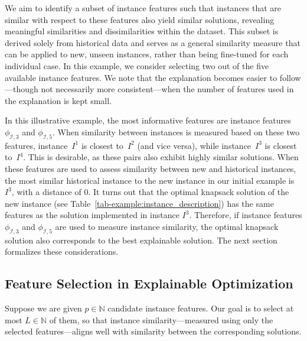 \documentclass[11pt, a4paper]{article}
\begin{document}
We aim to identify a subset of instance features such that instances that are similar with respect to these features also yield similar solutions, revealing meaningful similarities and dissimilarities within the dataset.
This subset is derived solely from historical data and serves as a general similarity measure that can be applied to new, unseen instances, rather than being fine-tuned for each individual case. 
In this example, we consider selecting two out of the five available instance features. We note that the explanation becomes easier to follow---though not necessarily more consistent---when the number of features used in the explanation is kept small.

In this illustrative example, the most informative features are instance features $\phi_{\mathcal{I},3}$ and $\phi_{\mathcal{I},5}$. When similarity between instances is measured based on these two features, instance~$I^1$ is closest to~$I^2$ (and vice versa), while instance~$I^3$ is closest to~$I^4$. This is desirable, as these pairs also exhibit highly similar solutions. When these features are used to assess similarity between new and historical instances, the most similar historical instance to the new instance in our initial example is $I^3$, with a distance of $0$. It turns out that the optimal knapsack solution of the new instance (see Table~\ref{tab-example:instance_description}) has the same features as the solution implemented in instance $I^3$. Therefore, if instance features $\phi_{\mathcal{I},3}$ and $\phi_{\mathcal{I},5}$ are used to measure instance similarity, the optimal knapsack solution also corresponds to the best explainable solution. The next section formalizes these considerations.



\subsection{Feature Selection in Explainable Optimization}


Suppose we are given $p \in \mathbb{N}$ candidate instance features. Our goal is to select at most $L \in \mathbb{N}$ of them, so that instance similarity---measured using only the selected features---aligns well with similarity between the corresponding solutions.
\end{document}
